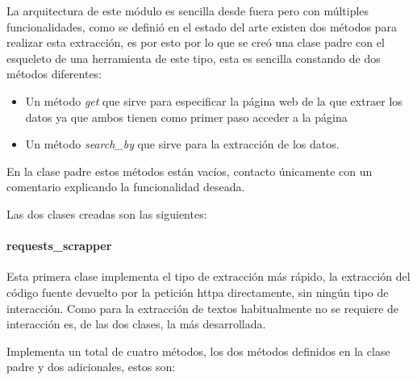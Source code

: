 La arquitectura de este módulo es sencilla desde fuera pero con múltiples
funcionalidades, como se definió en el estado del arte existen dos métodos para
realizar esta extracción, es por esto por lo que se creó una clase padre con el
esqueleto de una herramienta de este tipo, esta es sencilla constando de dos
métodos diferentes: 

\begin{itemize}
    \item Un método \textit{get} que sirve para especificar la página web de la que
    extraer los datos ya que ambos tienen como primer paso acceder a la página
    \item Un método \textit{search\_by} que sirve para la extracción de los datos. 
\end{itemize}

En la clase padre estos métodos están vacíos, contacto únicamente con un
comentario explicando la funcionalidad deseada.

Las dos clases creadas son las siguientes:
\paragraph{requests\_scrapper} Esta primera clase implementa el tipo de extracción más
rápido, la extracción del código fuente devuelto por la petición \gls{httpa}
directamente, sin ningún tipo de interacción. Como para la extracción de textos
habitualmente no se requiere de interacción es, de las dos clases, la más
desarrollada. 

Implementa un total de cuatro métodos, los dos métodos definidos en la clase
padre y dos adicionales, estos son: 

